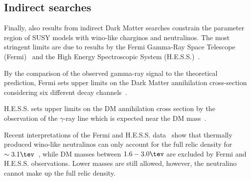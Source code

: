 \subsection*{Indirect searches}
Finally, also results from indirect Dark Matter searches constrain the parameter region of SUSY models with wino-like charginos and neutralinos.
The most stringent limits are due to results by the Fermi Gamma-Ray Space Telescope (Fermi)~\cite{bib:Fermi} and the High Energy Spectroscopic System (H.E.S.S.)~\cite{bib:HESS}.

By the comparison of the observed gamma-ray signal to the theoretical prediction, Fermi sets upper limits on the Dark Matter annihilation cross-section considering six different decay channels~\cite{bib:Fermi_DM}.

H.E.S.S. sets upper limits on the DM annihilation cross section by the observation of the $\gamma$-ray line which is expected near the DM mass~\cite{bib:HESS_DM}.

Recent interpretations of the Fermi and H.E.S.S. data~\cite{bib:IndirectSearches_Fan_2013,bib:IndirectSearches_Cohen_2013,bib:IndirectSearches_Hryczuk_2014,bib:IndirectSearches_Beneke_2015} show that thermally produced wino-like neutralinos can only account for the full relic density for $\sim3.1\tev$~\cite{bib:IndirectSearches_Cohen_2013}, while DM masses between $1.6-3.0\tev$ are excluded by Fermi and H.E.S.S. observations.
Lower masses are still allowed, however, the neutralino cannot make up the full relic density.


